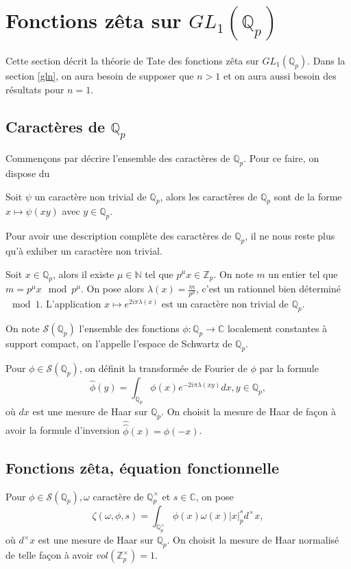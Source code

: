 \section{Fonctions zêta sur $GL_1(\mathbb{Q}_p)$}

Cette section décrit la théorie de Tate \cite{tate} des fonctions zêta sur $GL_1(\mathbb{Q}_p)$. Dans la section \ref{gln}, on aura besoin de supposer que $n > 1$ et on aura aussi besoin des résultats pour $n=1$.

\subsection{Caractères de $\mathbb{Q}_p$}

Commençons par décrire l'ensemble des caractères de $\mathbb{Q}_p$. Pour ce faire, on dispose du

\begin{lemme}
Soit $\psi$ un caractère non trivial de $\mathbb{Q}_p$, alors les caractères de $\mathbb{Q}_p$ sont de la forme $x \mapsto \psi(xy)$ avec $y \in \mathbb{Q}_p$.
\end{lemme}

Pour avoir une description complète des caractères de $\mathbb{Q}_p$, il ne nous reste plus qu'à exhiber un caractère non trivial.

Soit $x \in \mathbb{Q}_p$, alors il existe $\mu \in \mathbb{N}$ tel que $p^\mu x \in \mathbb{Z}_p$. On note $m$ un entier tel que $m = p^\mu x \mod p^\mu$. On pose alors $\lambda(x) = \frac{m}{p^\mu}$, c'est un rationnel bien déterminé $\mod 1$. L'application $x \mapsto e^{2i\pi \lambda(x)}$ est un caractère non trivial de $\mathbb{Q}_p$.

On note $\mathcal{S}(\mathbb{Q}_p)$ l'ensemble des fonctions $\phi : \mathbb{Q}_p \rightarrow \mathbb{C}$ localement constantes à support compact, on l'appelle l'espace de Schwartz de $\mathbb{Q}_p$.

Pour $\phi \in \mathcal{S}(\mathbb{Q}_p)$, on définit la transformée de Fourier de $\phi$ par la formule
\begin{equation}
\hat{\phi}(y) = \int_{\mathbb{Q}_p} \phi(x) e^{-2i\pi \lambda(xy)}dx, y \in \mathbb{Q}_p,
\end{equation}
où $dx$ est une mesure de Haar sur $\mathbb{Q}_p$. On choisit la mesure de Haar de façon à avoir la formule d'inversion $\hat{\hat{\phi}}(x)=\phi(-x)$.

\subsection{Fonctions zêta, équation fonctionnelle}
\begin{definition}
Pour $\phi \in \mathcal{S}(\mathbb{Q}_p), \omega$ caractère de $\mathbb{Q}_p^\times$ et $s \in \mathbb{C}$, on pose
\begin{equation}
\zeta(\omega,\phi,s) = \int_{\mathbb{Q}_p^\times} \phi(x) \omega(x) |x|_p^s d^\times x,
\end{equation}
où $d^\times x$ est une mesure de Haar sur $\mathbb{Q}_p$. On choisit la mesure de Haar normalisé de telle façon à avoir $vol(\mathbb{Z}_p^\times)=1$.
\end{definition}

